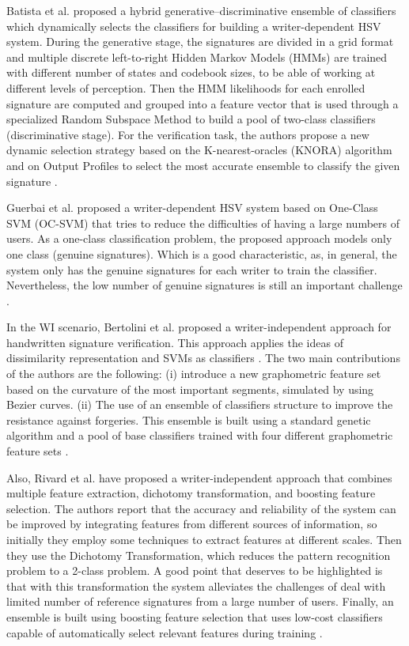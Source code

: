 \documentclass[conference]{IEEEtran}
\begin{document}
Batista et al. \cite{batista:12} proposed a hybrid generative–discriminative ensemble of classifiers which dynamically selects the classifiers for building a writer-dependent HSV system. During the generative stage, the signatures are divided in a grid format and multiple discrete left-to-right Hidden Markov Models (HMMs) are trained with different number of states and codebook sizes, to be able of working at different levels of perception. Then the HMM likelihoods for each enrolled signature are computed and grouped into a feature vector that is used through a specialized Random Subspace Method to build a pool of two-class classifiers (discriminative stage). For the verification task, the authors propose a new dynamic selection strategy based on the K-nearest-oracles (KNORA) algorithm and on Output Profiles to select the most accurate ensemble to classify the given signature \cite{batista:12}.


Guerbai et al. \cite{guerbai:15} proposed a writer-dependent HSV system based on One-Class SVM (OC-SVM) that tries to reduce the difficulties of having a large numbers of users. As a one-class classification problem, the proposed approach models only one class (genuine signatures). Which is a good characteristic, as, in general, the system only has the genuine signatures for each writer to train the classifier. Nevertheless, the low number of genuine signatures is still an important challenge \cite{guerbai:15}.


In the WI scenario, Bertolini et al. \cite{bertolini:10} proposed a  writer-independent approach for handwritten signature verification. This approach applies the ideas of dissimilarity representation and SVMs as classifiers \cite{bertolini:10}. The two main contributions of the authors are the following: (i) introduce a new graphometric feature set based on the curvature of the most important segments, simulated by using Bezier curves. (ii) The use of an ensemble of classifiers structure to improve the resistance against forgeries. This ensemble is built using a standard genetic algorithm and a pool of base classifiers trained with four different graphometric feature sets \cite{bertolini:10}.


Also, Rivard et al. \cite{rivard:13} have proposed a  writer-independent approach that combines multiple feature extraction, dichotomy transformation, and boosting feature selection. The authors report that the accuracy and reliability of the system can be improved by integrating features from different sources of information, so initially they employ some techniques to extract features at different scales. Then they use the Dichotomy Transformation, which reduces the pattern recognition problem to a 2-class problem. 
A good point that deserves to be highlighted is that with this transformation the system alleviates the challenges of deal with limited number of reference signatures from a large number of users. Finally, an ensemble is built using boosting feature selection that uses low-cost classifiers capable of automatically select relevant features during training \cite{rivard:13}. 
\end{document}
